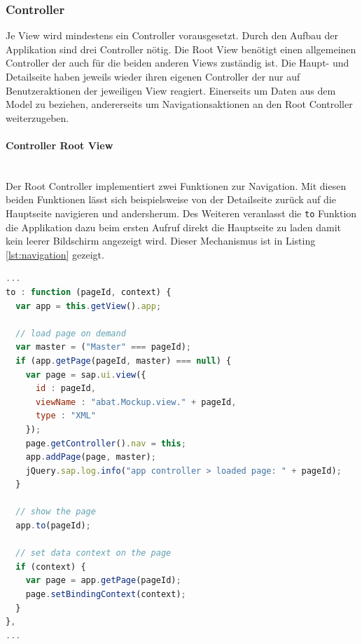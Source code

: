 \subsubsection{Controller}
Je View wird mindestens ein Controller vorausgesetzt. Durch den Aufbau der Applikation sind drei Controller nötig. Die Root View benötigt einen allgemeinen Controller der auch für die beiden anderen Views zuständig ist. Die Haupt- und Detailseite haben jeweils wieder ihren eigenen Controller der nur auf Benutzeraktionen der jeweiligen View reagiert. Einerseits um Daten aus dem Model zu beziehen, andererseits um Navigationsaktionen an den Root Controller weiterzugeben.

\paragraph{Controller Root View}$\;$ \\
Der Root Controller implementiert zwei Funktionen zur Navigation. Mit diesen beiden Funktionen lässt sich beispielsweise von der Detailseite zurück auf die Hauptseite navigieren und andersherum. Des Weiteren veranlasst die \texttt{to} Funktion die Applikation dazu beim ersten Aufruf direkt die Hauptseite zu laden damit kein leerer Bildschirm angezeigt wird. Dieser Mechanismus ist in Listing \ref{lst:navigation} gezeigt.

\vspace{1em}
\begin{lstlisting}[language=JavaScript, caption=Navigationsmechanismus, label=lst:navigation]
...
to : function (pageId, context) {
  var app = this.getView().app;

  // load page on demand
  var master = ("Master" === pageId);
  if (app.getPage(pageId, master) === null) {
    var page = sap.ui.view({
      id : pageId,
      viewName : "abat.Mockup.view." + pageId,
      type : "XML"
    });
	page.getController().nav = this;
	app.addPage(page, master);
	jQuery.sap.log.info("app controller > loaded page: " + pageId);
  }

  // show the page
  app.to(pageId);

  // set data context on the page
  if (context) {
    var page = app.getPage(pageId);
    page.setBindingContext(context);
  }
},
...
\end{lstlisting}

